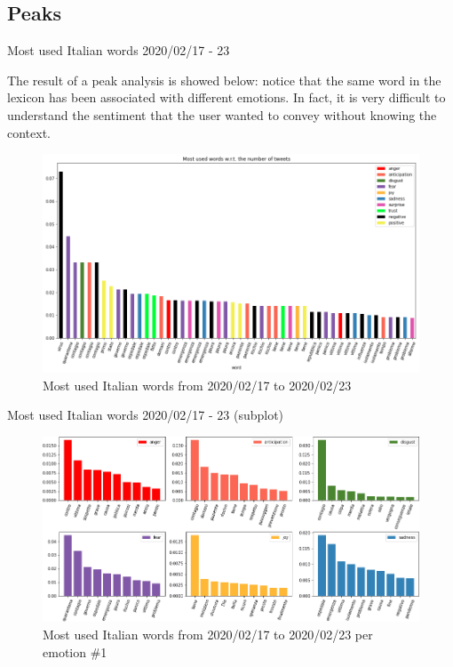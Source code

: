 \documentclass[8pt]{beamer}  %
\begin{document}
\subsection{Peaks}
\begin{frame}{Most used Italian words 2020/02/17 - 23}
	
	The result of a peak analysis is showed below: notice that the same word in the lexicon has been associated with different emotions. In fact, it is very difficult to understand the sentiment that the user wanted to convey without knowing the context.
	
	\begin{figure}[h]
    	\includegraphics[scale=.3]{assets/img/it_2020_02_17_most_used_words.png}
    	\caption{Most used Italian words from 2020/02/17 to 2020/02/23}
    	\label{fig:it_2020_02_17_most_used_words}
    \end{figure}
	
\end{frame}

\begin{frame}{Most used Italian words 2020/02/17 - 23 (subplot)}
	
	\begin{figure}[h]
    	\includegraphics[scale=.32]{assets/img/it_2020_02_17_most_used_words_subplots_1.png}
    	\caption{Most used Italian words from 2020/02/17 to 2020/02/23 per emotion \#1}
    	\label{fig:it_2020_02_17_most_used_words_subplots_1}
    \end{figure}
	
\end{frame}
\end{document}
